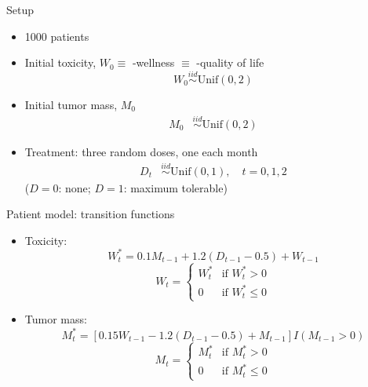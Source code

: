 \documentclass{beamer}
\begin{document}
\begin{frame}[c]{Setup}
  \begin{itemize}[<+->]
    \item 1000 patients
    
  \item Initial toxicity, $W_{0} \equiv$ -wellness $\equiv$ -quality of life
  \begin{equation*}
    W_{0} \overset{iid}{\sim} \text{Unif}(0, 2)
  \end{equation*}
  
  \item Initial tumor mass, $M_{0}$
  \begin{align*}
    M_{0} &\overset{iid}{\sim} \text{Unif}(0, 2)
  \end{align*}
  
  \item Treatment: three random doses, one each month
  \begin{align*}
    D_{t} &\overset{iid}{\sim} \text{Unif}(0, 1), \quad t = 0, 1, 2
  \end{align*}
  ($D = 0$: none; $D = 1$: maximum tolerable)
  \end{itemize}
\end{frame}

\begin{frame}[c]{Patient model: transition functions}
  \begin{itemize}[<+->]
    \item Toxicity:
  \begin{equation*}
  W^{*}_{t} = 0.1 M_{t-1} + 1.2 (D_{t-1} - 0.5) + W_{t - 1}
  \end{equation*}
  \begin{equation*}
  W_{t} = \begin{cases}
    W^{*}_{t} &\text{if } W^{*}_{t} > 0 \\
    0 &\text{if } W^{*}_{t} \leq 0
  \end{cases}
  \end{equation*}
  
  \item Tumor mass:
  \begin{equation*}
  M^{*}_{t} = [0.15 W_{t-1} - 1.2 (D_{t-1} - 0.5) + M_{t - 1}] I(M_{t-1} > 0)
  \end{equation*}
  \begin{equation*}
  M_{t} = \begin{cases}
    M^{*}_{t} &\text{if } M^{*}_{t} > 0 \\
    0 &\text{if } M^{*}_{t} \leq 0
  \end{cases}
  \end{equation*}
  \end{itemize}
\end{frame}
\end{document}
